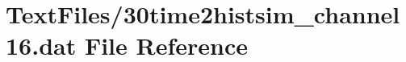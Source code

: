 \hypertarget{30time2histsim__channel16_8dat}{}\section{Text\+Files/30time2histsim\+\_\+channel16.dat File Reference}
\label{30time2histsim__channel16_8dat}
